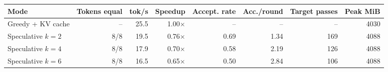 \begin{tabular}{lrrrrrrr}\toprule
Mode & Tokens equal & tok/s & Speedup & Accept. rate & Acc./round & Target passes & Peak MiB \\ \midrule
Greedy + KV cache & -- & 25.5 & 1.00$\times$ & -- & -- & -- & 4030 \\
Speculative $k=2$ & 8/8 & 19.5 & 0.76$\times$ & 0.69 & 1.34 & 169 & 4088 \\
Speculative $k=4$ & 8/8 & 17.9 & 0.70$\times$ & 0.58 & 2.19 & 126 & 4088 \\
Speculative $k=6$ & 8/8 & 16.5 & 0.65$\times$ & 0.50 & 2.84 & 106 & 4088 \\
\bottomrule\end{tabular}